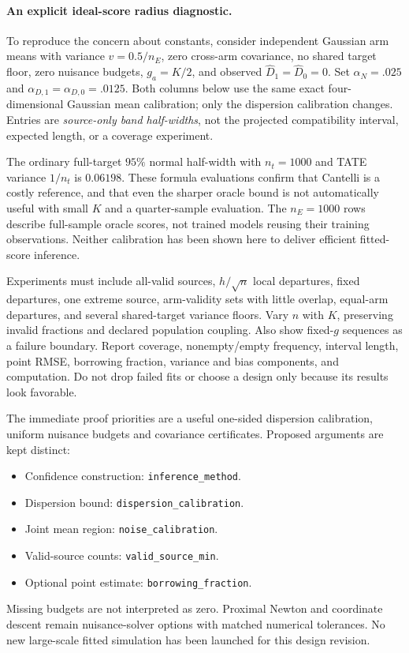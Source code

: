 \paragraph{An explicit ideal-score radius diagnostic.}
To reproduce the concern about constants, consider independent Gaussian
arm means with variance $v=0.5/n_E$, zero cross-arm covariance, no shared
target floor, zero nuisance budgets, $g_a=K/2$, and observed
$\widehat D_1=\widehat D_0=0$. Set $\alpha_N=.025$ and
$\alpha_{D,1}=\alpha_{D,0}=.0125$. Both columns below use the same exact
four-dimensional Gaussian mean calibration; only the dispersion calibration
changes. Entries are \emph{source-only band half-widths}, not the projected
compatibility interval, expected length, or a coverage experiment.

The ordinary full-target $95\%$ normal half-width with $n_t=1000$ and
TATE variance $1/n_t$ is $0.06198$. These formula evaluations confirm that
Cantelli is a costly reference, and that even the sharper oracle bound is
not automatically useful with small $K$ and a quarter-sample evaluation.
The $n_E=1000$ rows describe full-sample oracle scores, not trained models
reusing their training observations. Neither calibration has been shown here
to deliver efficient fitted-score inference.

Experiments must include all-valid sources, $h/\sqrt n$ local departures,
fixed departures, one extreme source, arm-validity sets with little overlap,
equal-arm departures, and several shared-target variance floors. Vary $n$
with $K$, preserving invalid fractions and declared population coupling.
Also show fixed-$g$ sequences as a failure boundary. Report coverage,
nonempty/empty frequency, interval length, point RMSE, borrowing fraction,
variance and bias components, and computation. Do not drop failed fits or
choose a design only because its results look favorable.

The immediate proof priorities are a useful one-sided dispersion calibration,
uniform nuisance budgets and covariance certificates. Proposed arguments are
kept distinct:
\begin{itemize}
\item Confidence construction: \texttt{inference\_method}.
\item Dispersion bound: \texttt{dispersion\_calibration}.
\item Joint mean region: \texttt{noise\_calibration}.
\item Valid-source counts: \texttt{valid\_source\_min}.
\item Optional point estimate: \texttt{borrowing\_fraction}.
\end{itemize}
Missing budgets are not interpreted as zero.
Proximal Newton and coordinate descent remain nuisance-solver options with
matched numerical tolerances. No new large-scale fitted simulation has been
launched for this design revision.

